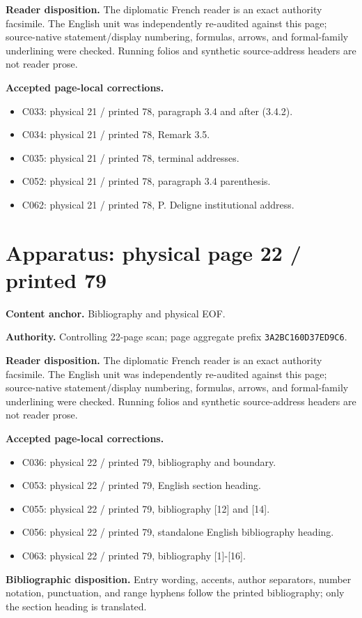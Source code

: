 \documentclass[10pt]{article}
\begin{document}
\textbf{Reader disposition.} The diplomatic French reader is an exact authority facsimile. The English unit was independently re-audited against this page; source-native statement/display numbering, formulas, arrows, and formal-family underlining were checked. Running folios and synthetic source-address headers are not reader prose.

\textbf{Accepted page-local corrections.} \begin{itemize}
\item C033: physical 21 / printed 78, paragraph 3.4 and after (3.4.2).
\item C034: physical 21 / printed 78, Remark 3.5.
\item C035: physical 21 / printed 78, terminal addresses.
\item C052: physical 21 / printed 78, paragraph 3.4 parenthesis.
\item C062: physical 21 / printed 78, P. Deligne institutional address.
\end{itemize}
\newpage
\setcounter{footnote}{0}
\fontsize{10.2pt}{12.04pt}\selectfont
\section*{Apparatus: physical page 22 / printed 79}
\textbf{Content anchor.} Bibliography and physical EOF.

\textbf{Authority.} Controlling 22-page scan; page aggregate prefix \texttt{3A2BC160D37ED9C6}.

\textbf{Reader disposition.} The diplomatic French reader is an exact authority facsimile. The English unit was independently re-audited against this page; source-native statement/display numbering, formulas, arrows, and formal-family underlining were checked. Running folios and synthetic source-address headers are not reader prose.

\textbf{Accepted page-local corrections.} \begin{itemize}
\item C036: physical 22 / printed 79, bibliography and boundary.
\item C053: physical 22 / printed 79, English section heading.
\item C055: physical 22 / printed 79, bibliography [12] and [14].
\item C056: physical 22 / printed 79, standalone English bibliography heading.
\item C063: physical 22 / printed 79, bibliography [1]-[16].
\end{itemize}


\textbf{Bibliographic disposition.} Entry wording, accents, author separators, number notation, punctuation, and range hyphens follow the printed bibliography; only the section heading is translated.
\end{document}
